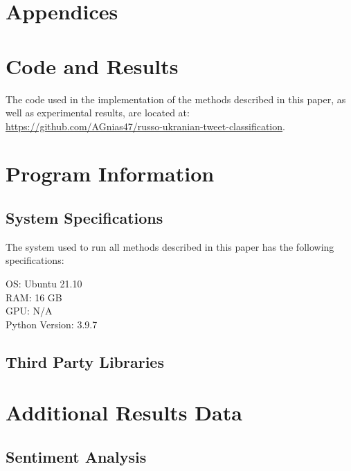 \documentclass[12pt,letterpaper,oneside,titlepage]{article}
\begin{document}
\pagebreak

\section*{Appendices}

\appendix

\section{Code and Results}

The code used in the implementation of the methods described in this paper, as well as experimental results,
are located at: \\
\url{https://github.com/AGnias47/russo-ukranian-tweet-classification}.

\section{Program Information}

\subsection{System Specifications}

The system used to run all methods described in this paper has the following specifications:

OS: Ubuntu 21.10 \\
RAM: 16 GB \\
GPU: N/A \\
Python Version: 3.9.7

\subsection{Third Party Libraries}



\pagebreak

\section{Additional Results Data}

\subsection{Sentiment Analysis}
\end{document}
